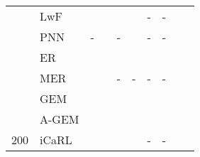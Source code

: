 \documentclass{article}
\begin{document}
\begin{table}[H]
{{\begin{tabular}{clcccccccc}
                        & LwF                   &  \tiny{}                                  &   \tiny{}                                  & \tiny{}                                           &  \tiny{}                                          & -                                                                     & -                       \\
                        & PNN                   & -                                                         &   \tiny{}        & -                                                                 &  \tiny{} &                                          -                       &                                               -                       \\
\midrule                                                                                            
                        & ER                    &  \tiny{}                                  &   \tiny{}                                  & \tiny{}                                           &   \tiny{}                                          & \tiny{}                                               &  \tiny{} \\
                        & MER                   &  \tiny{}                                  &   \tiny{}                                  & -                                                                  & -                                                                & -                                                                     & -                       \\
                        & GEM                   &  \tiny{}                                  &   \tiny{}                                  & \tiny{}                                           &   \tiny{}                                          & \tiny{}                                               & \tiny{} \\
                        & A-GEM                 &  \tiny{}                                  &   \tiny{}                                  & \tiny{}                                           &  \tiny{}                                          & \tiny{}                                               & \tiny{} \\
\multirow{2}{*}{200}    & iCaRL                 &  \tiny{}        &   \tiny{}        & \tiny{}                 &   \tiny{}                                          & -                                                                     & -                       \\

\end{tabular}}}
\end{table}
\end{document}

